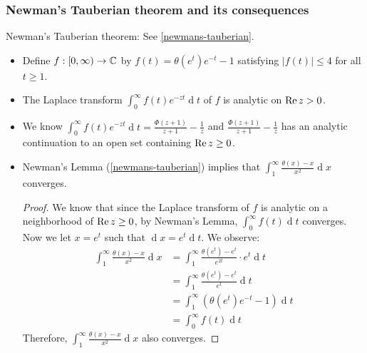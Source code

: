 \documentclass[12pt]{article}
\renewcommand{\d}{\ensuremath{\operatorname{d}}}
\begin{document}
\subsubsection{Newman's Tauberian theorem and its consequences}
Newman's Tauberian theorem: See \cref{newmans-tauberian}.
\begin{itemize}
    \item Define  $f:[0,\infty)\to \mathbb{C}$ by $f(t) = \theta(e^t)e^{-t}-1$ satisfying $|f(t)| \leq 4$ for all $t \geq 1$.
    \item The Laplace transform $\displaystyle \int_0^{\infty} f(t)e^{-zt}\d t$ of $f$ is analytic on $\operatorname{Re} z > 0$.
    \item We know $\displaystyle\int_0^{\infty} f(t) e^{-zt}\d t = \frac{\Phi(z+1)}{z+1} - \frac{1}{z}$ and $\displaystyle \frac{\Phi(z+1)}{z+1} - \frac{1}{z} $ has an analytic continuation to an open set containing $\operatorname{Re} z \geq 0$.
    \item Newman's Lemma (\cref{newmans-tauberian}) implies that $\displaystyle \int_1^{\infty} \frac{\theta(x)-x}{x^2}\d x$ converges.\begin{proof}
        We know that since the Laplace transform of $f$ is analytic on a neighborhood of $\operatorname{Re} z\geq 0$, by Newman's Lemma, $\int_{0}^\infty f(t)\d t$ converges. Now we let $x=e^t$ such that $\d x = e^t \d t$. We observe:
	\begin{align*}
		\int_1^{\infty} \frac{\theta(x)-x}{x^2}\d x &= \int_1^{\infty} \frac{\theta(e^t)-e^t}{e^{2t}}\cdot e^t\d t\\
		&= \int_1^{\infty} \frac{\theta(e^t)-e^t}{e^{t}}\d t\\
		&= \int_1^\infty (\theta(e^t)e^{-t}-1)\d t\\
		&= \int_{0}^\infty f(t)\d t
	\end{align*}
	Therefore, \(\int_1^{\infty} \frac{\theta(x)-x}{x^2}\d x \) also converges.
    \end{proof}
\end{itemize}
\end{document}
